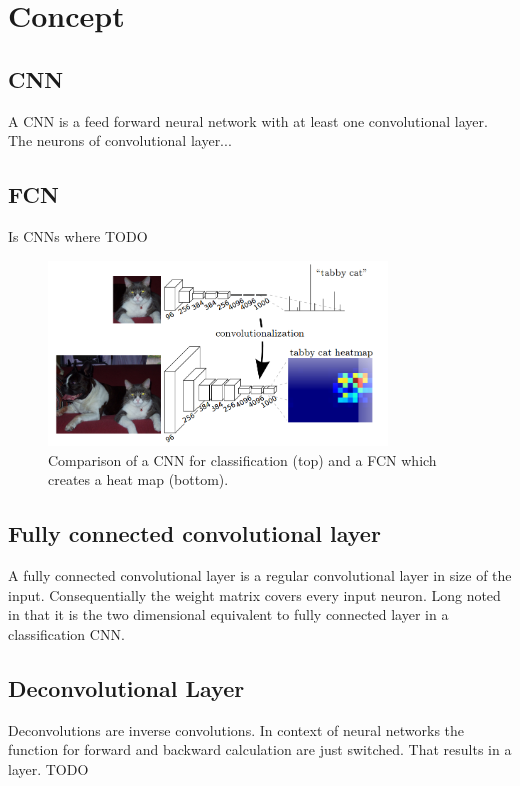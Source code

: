 \section{Concept}\label{sec:concept}
\subsection{CNN}
A \gls{CNN} is a feed forward neural network with at least one convolutional
layer. The neurons of convolutional layer...


\subsection{FCN}
Is \glspl{CNN} where TODO

\begin{figure}[htb]
	\centering
	\includegraphics[width=9cm]{figures/fcnn}
	\caption{Comparison of a \gls{CNN} for classification (top) and a \gls{FCN} which creates a heat map (bottom). \cite{long2014fully}}
\end{figure}

\subsection{Fully connected convolutional layer}
A fully connected convolutional layer is a regular convolutional layer in size
of the input. Consequentially the weight matrix covers every input neuron. Long
noted in \cite{long2014fully} that it is the two dimensional equivalent to
fully connected layer in a classification \gls{CNN}.

\subsection{Deconvolutional Layer}
Deconvolutions are inverse convolutions. In context of neural networks the
function for forward and backward calculation are just switched. That results
in a layer. TODO
